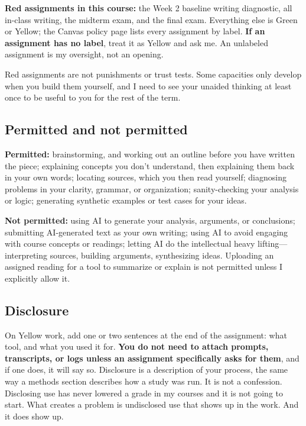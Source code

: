 \documentclass[12pt]{article}
\begin{document}
\noindent \textbf{Red assignments in this course:} the Week 2 baseline writing diagnostic, all in-class writing, the midterm exam, and the final exam. Everything else is Green or Yellow; the Canvas policy page lists every assignment by label. \textbf{If an assignment has no label}, treat it as Yellow and ask me. An unlabeled assignment is my oversight, not an opening.

\vspace{0.5em}
\noindent Red assignments are not punishments or trust tests. Some capacities only develop when you build them yourself, and I need to see your unaided thinking at least once to be useful to you for the rest of the term.

\subsection*{Permitted and not permitted}

\noindent \textbf{Permitted:} brainstorming, and working out an outline before you have written the piece; explaining concepts you don't understand, then explaining them back in your own words; locating sources, which you then read yourself; diagnosing problems in your clarity, grammar, or organization; sanity-checking your analysis or logic; generating synthetic examples or test cases for your ideas.

\vspace{0.5em}
\noindent \textbf{Not permitted:} using AI to generate your analysis, arguments, or conclusions; submitting AI-generated text as your own writing; using AI to avoid engaging with course concepts or readings; letting AI do the intellectual heavy lifting---interpreting sources, building arguments, synthesizing ideas. Uploading an assigned reading for a tool to summarize or explain is not permitted unless I explicitly allow it.

\subsection*{Disclosure}

On Yellow work, add one or two sentences at the end of the assignment: what tool, and what you used it for. \textbf{You do not need to attach prompts, transcripts, or logs unless an assignment specifically asks for them}, and if one does, it will say so. Disclosure is a description of your process, the same way a methods section describes how a study was run. It is not a confession. Disclosing use has never lowered a grade in my courses and it is not going to start. What creates a problem is undisclosed use that shows up in the work. And it does show up.
\end{document}
